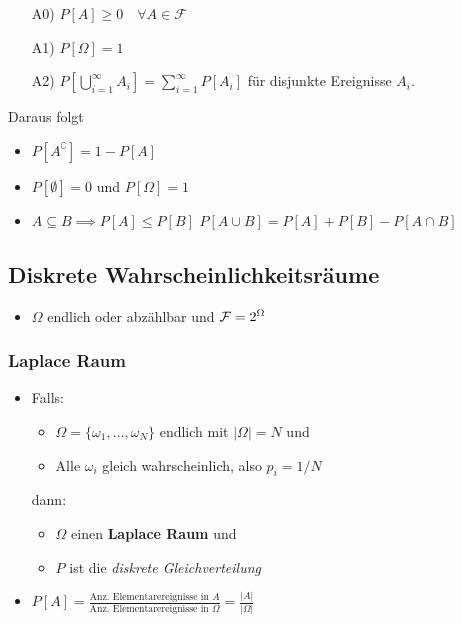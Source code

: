 \begin{itemize}
        \begin{itemize}
            \item[A0)] $P[A] \geq 0 \quad \forall A \in \mathcal{F}$
            \item[A1)] $P[\Omega] = 1$
            \item[A2)] $P\left[ \bigcup_{i=1}^\infty A_i \right] = \sum_{i=1}^\infty P[A_i]$ für disjunkte Ereignisse $A_i$.
        \end{itemize}
        Daraus folgt
        \begin{itemize}
            \item $P[A^\complement] = 1 - P[A]$
            \item $P[\emptyset] = 0$ und $P[\Omega] = 1$
            \item $A \subseteq B \implies P[A] \leq P[B]$
             $P[A \cup B] = P[A] + P[B] - P[A\cap B]$
        \end{itemize}
\end{itemize}

\subsection{Diskrete Wahrscheinlichkeitsräume}
\begin{itemize}
    \item $\Omega$ endlich oder abzählbar und $\mathcal{F} = 2^\Omega$
\end{itemize}

\subsubsection{Laplace Raum}
\begin{itemize}
    \item Falls:
        \begin{itemize}
            \item $\Omega = \{\omega_1, \dots, \omega_N\}$ endlich mit $|\Omega| = N$ und
            \item Alle $\omega_i$ gleich wahrscheinlich, also $p_i = 1/N$
        \end{itemize}
    dann:
        \begin{itemize}
            \item $\Omega$ einen \textbf{Laplace Raum} und
            \item $P$ ist die \textit{diskrete Gleichverteilung}
        \end{itemize}
    \item $ P[A] = \frac{\mbox{Anz. Elementarereignisse in } A}{\mbox{Anz. Elementarereignisse in } \Omega} = \frac{|A|}{|\Omega|}$

\end{itemize}

